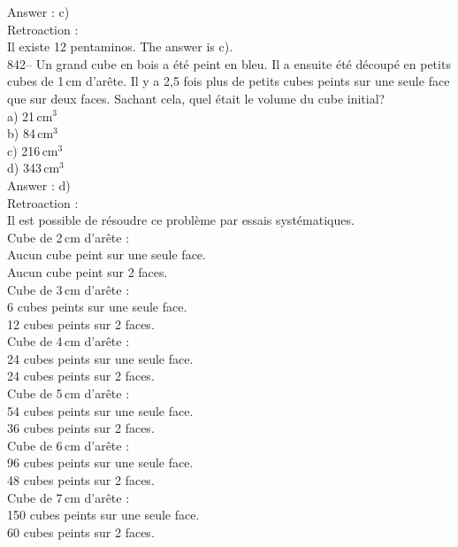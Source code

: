 ﻿\documentclass[letterpaper, 12pt]{article}
\begin{document}
Answer : c)\\

Retroaction : \\
Il existe 12 pentaminos.  The answer is c).\\

842-- Un grand cube en bois a \'et\'e peint en bleu.  Il a ensuite \'et\'e
d\'ecoup\'e en petits cubes de 1\,cm d'ar\^ete.  Il y a 2,5 fois plus de
petits cubes peints sur une seule face que sur deux faces.  Sachant cela,
quel \'etait le volume du cube initial?\\
a) 21\,cm$^{3}$\\
b) 84\,cm$^{3}$\\
c) 216\,cm$^{3}$\\
d) 343\,cm$^{3}$\\

Answer : d)\\

Retroaction : \\
Il est possible de r\'esoudre ce probl\`eme par essais syst\'ematiques.  \\
Cube de 2\,cm d'ar\^ete :\\
Aucun cube peint sur une seule face.\\
Aucun cube peint sur 2 faces.\\

Cube de 3\,cm d'ar\^ete :\\
6 cubes peints sur une seule face.\\
12 cubes peints sur 2 faces.\\

Cube de 4\,cm d'ar\^ete :\\
24 cubes peints sur une seule face.\\
24 cubes peints sur 2 faces.\\

Cube de 5\,cm d'ar\^ete :\\
54 cubes peints sur une seule face.\\
36 cubes peints sur 2 faces.\\

Cube de 6\,cm d'ar\^ete :\\
96 cubes peints sur une seule face.\\
48 cubes peints sur 2 faces.\\

Cube de 7\,cm d'ar\^ete :\\
150 cubes peints sur une seule face.\\
60 cubes peints sur 2 faces.\\
\end{document}
